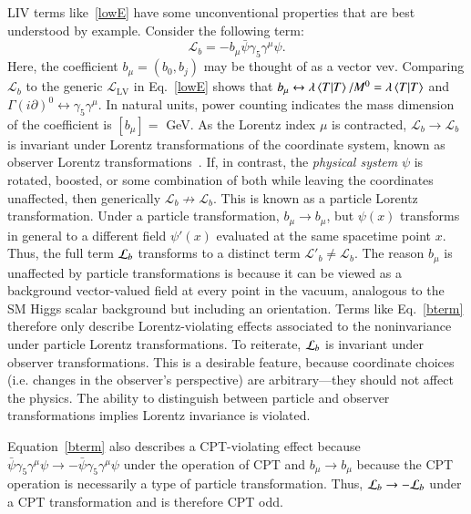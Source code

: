LIV terms like~\eqref{lowE} have some unconventional properties
that are best understood by example.
Consider the following term:
\begin{equation}
\label{bterm}
\mathcal{L}_b = -b_\mu \bar \psi \gamma_5\gamma^\mu \psi.
\end{equation}
Here, the coefficient $b_\mu = (b_0,b_j)$ may be thought of as a vector vev.
Comparing $\mathcal{L}_b$ to the generic $\mathcal{L}_{\text{LV}}$ in 
Eq.~\eqref{lowE} shows that $b_\mu \leftrightarrow 
\lambda \braket{T}/M^0 =  \lambda \braket{T}$
and $\Gamma(i\partial)^0 \leftrightarrow \gamma_5\gamma^\mu$. 
In natural units, power counting indicates the 
mass dimension of the coefficient is $[b_\mu] = $\; GeV. As the Lorentz
index $\mu$ is contracted, $\mathcal{L}_b \rightarrow \mathcal{L}_b$ is invariant under Lorentz
transformations of the coordinate system, known as observer Lorentz transformations~\cite{ck97}.
If, in contrast, the \textit{physical system} $\psi$ is rotated, boosted, or some combination of both
while leaving the coordinates unaffected, 
then generically $\mathcal{L}_b \not\rightarrow \mathcal{L}_b$. 
This is known as a particle Lorentz transformation.
Under a particle transformation, $b_\mu \rightarrow b_\mu$, but
$\psi(x)$ transforms 
in general to a different field $\psi'(x)$ 
evaluated at the same spacetime point $x$. Thus, 
the full term ${\cal L}_b$ transforms to a distinct term
$\mathcal{L}'_b \neq \mathcal{L}_b$.
The reason $b_\mu$ is unaffected by particle transformations
is because it can be viewed as a 
background vector-valued field at 
every point in the vacuum, analogous
to the SM Higgs scalar background but including an orientation.
Terms like Eq.~\eqref{bterm} therefore only describe Lorentz-violating 
effects associated to the noninvariance under 
particle Lorentz transformations. 
To reiterate, ${\cal L}_b$ is invariant under observer transformations.
This is a desirable feature, because coordinate choices (i.e. changes
in the observer's perspective) 
are arbitrary---they should not affect the physics.
The ability to distinguish between particle and observer transformations
implies Lorentz invariance is violated. 

Equation~\eqref{bterm} also describes a 
CPT-violating effect because $\bar \psi \gamma_5\gamma^\mu \psi \rightarrow
-\bar\psi \gamma_5\gamma^\mu \psi$ under the operation of CPT and $b_\mu\rightarrow b_\mu$
because the CPT operation is necessarily a type of particle transformation. 
Thus, ${\cal L}_b \rightarrow -{\cal L}_b$ under a CPT transformation and is therefore CPT odd.

